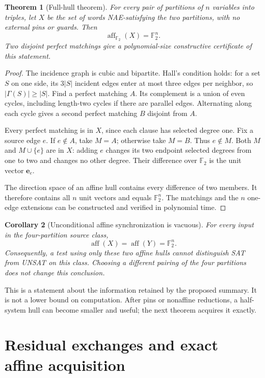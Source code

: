 \documentclass[11pt,letterpaper]{article}
\newtheorem{theorem}{Theorem}
\newtheorem{corollary}[theorem]{Corollary}
\theoremstyle{definition}
\newcommand{\F}{\mathbb F_2}
\newcommand{\aff}{\operatorname{aff}}
\begin{document}
\begin{theorem}[Full-hull theorem]\label{thm:fullhull}
For every pair of partitions of $n$ variables into triples, let $X$ be the set of words NAE-satisfying the two partitions, with no external pins or guards. Then
\[
\aff_{\F}(X)=\F^n.
\]
Two disjoint perfect matchings give a polynomial-size constructive certificate of this statement.
\end{theorem}
\begin{proof}
The incidence graph is cubic and bipartite. Hall's condition holds: for a set $S$ on one side, its $3|S|$ incident edges enter at most three edges per neighbor, so $|\Gamma(S)|\ge|S|$. Find a perfect matching $A$. Its complement is a union of even cycles, including length-two cycles if there are parallel edges. Alternating along each cycle gives a second perfect matching $B$ disjoint from $A$.

Every perfect matching is in $X$, since each clause has selected degree one. Fix a source edge $e$. If $e\notin A$, take $M=A$; otherwise take $M=B$. Thus $e\notin M$. Both $M$ and $M\cup\{e\}$ are in $X$: adding $e$ changes its two endpoint selected degrees from one to two and changes no other degree. Their difference over $\F$ is the unit vector $\mathbf e_e$.

The direction space of an affine hull contains every difference of two members. It therefore contains all $n$ unit vectors and equals $\F^n$. The matchings and the $n$ one-edge extensions can be constructed and verified in polynomial time.
\end{proof}

\begin{corollary}[Unconditional affine synchronization is vacuous]
For every input in the four-partition source class,
\[
\aff(X)=\aff(Y)=\F^n.
\]
Consequently, a test using only these two affine hulls cannot distinguish SAT from UNSAT on this class. Choosing a different pairing of the four partitions does not change this conclusion.
\end{corollary}

This is a statement about the information retained by the proposed summary. It is not a lower bound on computation. After pins or nonaffine reductions, a half-system hull can become smaller and useful; the next theorem acquires it exactly.

\section{Residual exchanges and exact affine acquisition}
\end{document}
